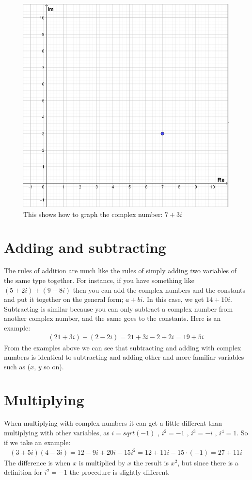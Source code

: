 \begin{figure}[H]
  \includegraphics[scale=0.45]{fig/img/complex_plan.png}
   \caption{This shows how to graph the complex number: $7+3i$}
\end{figure}

\section{Adding and subtracting}
The rules of addition are much like the rules of simply adding two variables of the same type together. For instance, if you have something like $(5+2i)+(9+8i)$ then you can add the complex numbers and the constants and put it together on the general form; $a+bi$. In this case, we get $14+10i$. 
\\
Subtracting is similar because you can only subtract a complex number from another complex number, and the same goes to the constants. Here is an example: \\
\begin{align*}
(21 + 3i) - (2 - 2i) = 21 + 3i - 2 + 2i = 19 + 5i
\end{align*}
From the examples above we can see that subtracting and adding with complex numbers is identical to subtracting and adding other and more familiar variables such as ($x$, $y$ so on).

\section{Multiplying}
When multiplying with complex numbers it can get a little different than multiplying with other variables, as $i=sqrt(-1)$ , $i^2=-1$ , $i^3=-i$ , $i^4=1$. So if we take an example: \\
\begin{align*}
(3+5i)(4-3i) =
 12 - 9i + 20i - 15i^2 = 
 12 + 11i - 15 \cdot (-1) = 
 27 + 11i
\end{align*}
The difference is when $x$ is multiplied by $x$ the result is $x^2$, but since there is a definition for $i^2=-1$ the procedure is slightly different.


